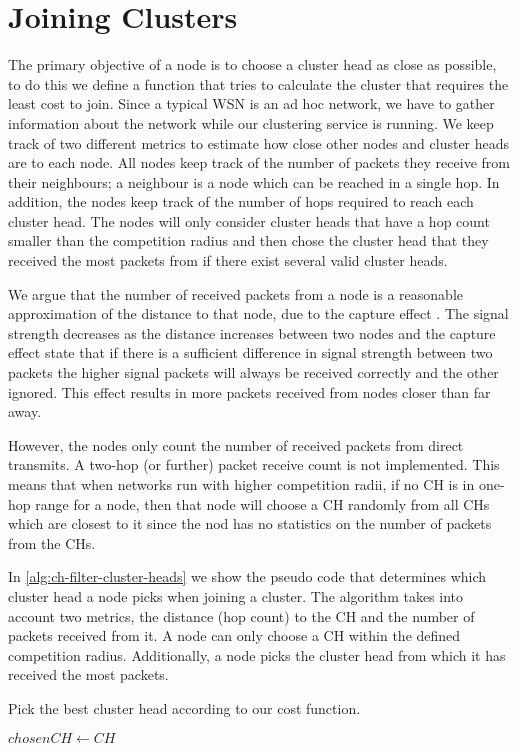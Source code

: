 \section{Joining Clusters}
The primary objective of a node is to choose a cluster head as close as possible, to do this we define a function that tries to calculate the cluster that requires the least cost to join. Since a typical WSN is an ad hoc network, we have to gather information about the network while our clustering service is running. We keep track of two different metrics to estimate how close other nodes and cluster heads are to each node. All nodes keep track of the number of packets they receive from their neighbours; a neighbour is a node which can be reached in a single hop. In addition, the nodes keep track of the number of hops required to reach each cluster head. The nodes will only consider cluster heads that have a hop count smaller than the competition radius and then chose the cluster head that they received the most packets from if there exist several valid cluster heads.

We argue that the number of received packets from a node is a reasonable approximation of the distance to that node, due to the capture effect \cite{Lee2007-capture-effect}. The signal strength decreases as the distance increases between two nodes and the capture effect state that if there is a sufficient difference in signal strength between two packets the higher signal packets will always be received correctly and the other ignored. This effect results in more packets received from nodes closer than far away.

However, the nodes only count the number of received packets from direct transmits. A two-hop (or further) packet receive count is not implemented. This means that when networks run with higher competition radii, if no CH is in one-hop range for a node, then that node will choose a CH randomly from all CHs which are closest to it since the nod has no statistics on the number of packets from the CHs.

In \cref{alg:ch-filter-cluster-heads} we show the pseudo code that determines which cluster head a node picks when joining a cluster. The algorithm takes into account two metrics, the distance (hop count) to the CH and the number of packets received from it. A node can only choose a CH within the defined competition radius. Additionally, a node picks the cluster head from which it has received the most packets.

\begin{algorithm}
\caption{Pick the best cluster head according to our cost function.}
\label{alg:ch-filter-cluster-heads}
\begin{algorithmic}[1]
                \State $chosenCH \gets CH$
            \EndIf
        \EndIf
    \EndFor
\EndProcedure
\end{algorithmic}
\end{algorithm}


